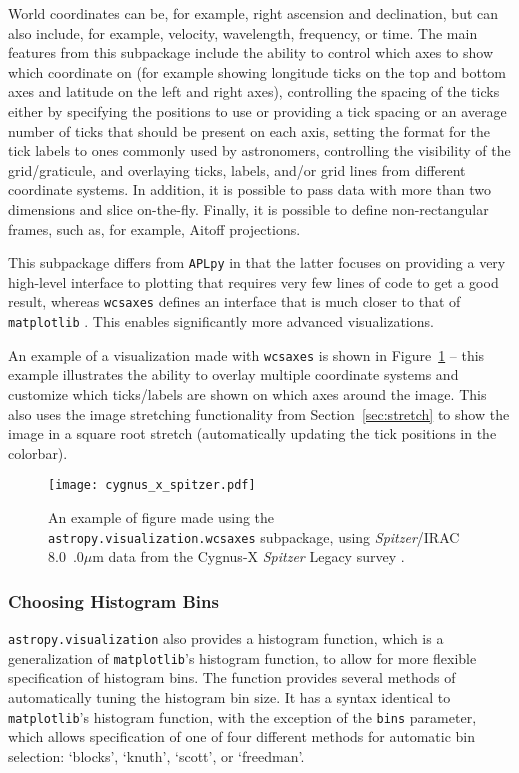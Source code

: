 \documentclass[modern]{aastex61}
\newcommand{\package}[1]{\texttt{#1}\xspace}
\newcommand{\sectionname}{Section\xspace}
\renewcommand{\figurename}{Figure\xspace}
\begin{document}
World coordinates can be, for example, right ascension and declination, but can also include, for example, velocity, wavelength, frequency, or time. The main features from this subpackage include the ability to control which axes to show which coordinate on (for example showing longitude ticks on the top and bottom axes and latitude on the left and right axes), controlling the spacing of the ticks either by specifying the positions to use or providing a tick spacing or an average number of ticks that should be present on each axis, setting the format for the tick labels to ones commonly used by astronomers, controlling the visibility of the grid/graticule, and overlaying ticks, labels, and/or grid lines from different coordinate systems. In addition, it is possible to pass data with more than two dimensions and slice on-the-fly. Finally, it is possible to define non-rectangular frames, such as, for example, Aitoff projections.

This subpackage differs from \package{APLpy} \citep{aplpy} in that the latter focuses on providing a very high-level interface to plotting that requires very few lines of code to get a good result, whereas \package{wcsaxes} defines an interface that is much closer to that of \package{matplotlib} \citep{matplotlib}. This enables significantly more advanced visualizations.

An example of a visualization made with \package{wcsaxes} is shown in \figurename~\ref{fig:wcsaxes} -- this example illustrates the ability to overlay multiple coordinate systems and customize which ticks/labels are shown on which axes around the image. This also uses the image stretching functionality from \sectionname~\ref{sec:stretch} to show the image in a square root stretch (automatically updating the tick positions in the colorbar).

\begin{figure}
\texttt{[image: cygnus\_x\_spitzer.pdf]}
\caption{%
An example of figure made using the \package{astropy.visualization.wcsaxes} subpackage, using \textit{Spitzer}/IRAC 8.0~$.0\mu$m data from the Cygnus-X \textit{Spitzer} Legacy survey \citep{cygnusx}.
\label{fig:wcsaxes}
}
\end{figure}

\subsubsection{Choosing Histogram Bins}

\package{astropy.visualization} also provides a histogram function, which is a
generalization of \texttt{matplotlib}’s histogram function, to allow for more
flexible specification of histogram bins.  The function provides several methods
of automatically tuning the histogram bin size. It has a syntax identical to
\texttt{matplotlib}’s histogram function, with the exception of the \texttt{bins}
parameter, which allows specification of one of four different methods for
automatic bin selection: `blocks', `knuth', `scott', or `freedman'.
\end{document}
